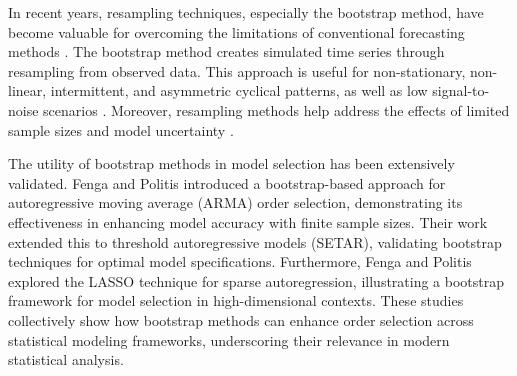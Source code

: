 \documentclass[ijoc,sglanonrev]{informs4}
\begin{document}

In recent years, resampling techniques, especially the bootstrap method, have become valuable for overcoming the limitations of conventional forecasting methods \citep{hasni2019spare}. The bootstrap method creates simulated time series through resampling from observed data. This approach is useful for non-stationary, non-linear, intermittent, and asymmetric cyclical patterns, as well as low signal-to-noise scenarios \citep{feliu2024enhancing, suman2024deep, kreiss2012bootstrap}. Moreover, resampling methods help address the effects of limited sample sizes \citep{davison1997bootstrap}  and model uncertainty \citep{sarris2020exploiting}. 

The utility of bootstrap methods in model selection has been extensively validated. Fenga and Politis \citep{fenga2011bootstrap} introduced a bootstrap-based approach for autoregressive moving average (ARMA) order selection, demonstrating its effectiveness in enhancing model accuracy with finite sample sizes. Their work \citep{fenga2013bootstrap} extended this to threshold autoregressive models (SETAR), validating bootstrap techniques for optimal model specifications. Furthermore, Fenga and Politis \citep{fenga2017lasso} explored the LASSO technique for sparse autoregression, illustrating a bootstrap framework for model selection in high-dimensional contexts. These studies collectively show how bootstrap methods can enhance order selection across statistical modeling frameworks, underscoring their relevance in modern statistical analysis.
\end{document}
